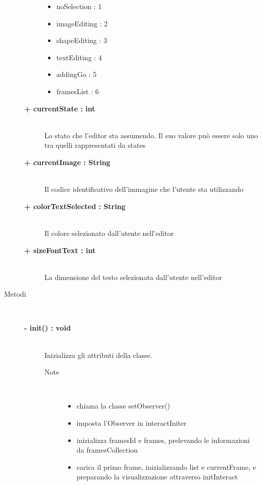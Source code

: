 \begin{description}
\begin{description}
		\begin{itemize}
			\item noSelection : 1
			\item imageEditing : 2
			\item shapeEditing : 3
			\item textEditing : 4
			\item addingGo : 5
			\item framesList : 6
		\end{itemize}
		\item[\textbf{+ currentState : int			}] \hfill \\
			Lo stato che l'editor sta assumendo. Il suo valore può essere solo uno tra quelli rappresentati da states
		\item[\textbf{+ currentImage : String			}] \hfill \\
			Il codice identificativo dell'immagine che l'utente sta utilizzando
		\item[\textbf{+ colorTextSelected : String			}] \hfill \\
			Il colore selezionato dall'utente nell'editor
		\item[\textbf{+ sizeFontText : int			}] \hfill \\
			La dimensione del testo selezionata dall'utente nell'editor
	\end{description}
	
	
\item[Metodi] \hfill \\

	\begin{description}
		\item[\textbf{\color{blue}- init() : void			}] \hfill \\
			Inizializza gli attributi della classe.
			
		\begin{description}
			
			\item[Note] \hfill \\
			\begin{itemize}
					\item chiama la classe setObserver()
					\item imposta l'Observer in interactIniter
					\item inizializza framesId e frames, prelevando le informazioni da framesCollection
					\item carica il primo frame, inizializzando list e currentFrame, e preparando la visualizzazione attraverso initInteract
			\end{itemize}
		\end{description}
	\end{description}
	

\end{description}
